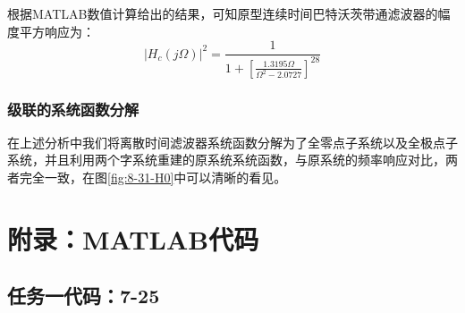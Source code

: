 \documentclass[UTF8,12pt,a4paper]{ctexart}
\begin{document}
根据MATLAB数值计算给出的结果，可知原型连续时间巴特沃茨带通滤波器的幅度平方响应为：
$$|H_c(j\Omega)|^2 = \frac{1}{1 + [\frac{1.3195\Omega}{\Omega^2 - 2.0727}]^{28}}$$

\subsubsection{级联的系统函数分解}
在上述分析中我们将离散时间滤波器系统函数分解为了全零点子系统以及全极点子系统，并且利用两个字系统重建的原系统系统函数，与原系统的频率响应对比，两者完全一致，在图\ref{fig:8-31-H0}中可以清晰的看见。

\newpage
\section{附录：MATLAB代码}

\subsection{任务一代码：7-25}
\end{document}
